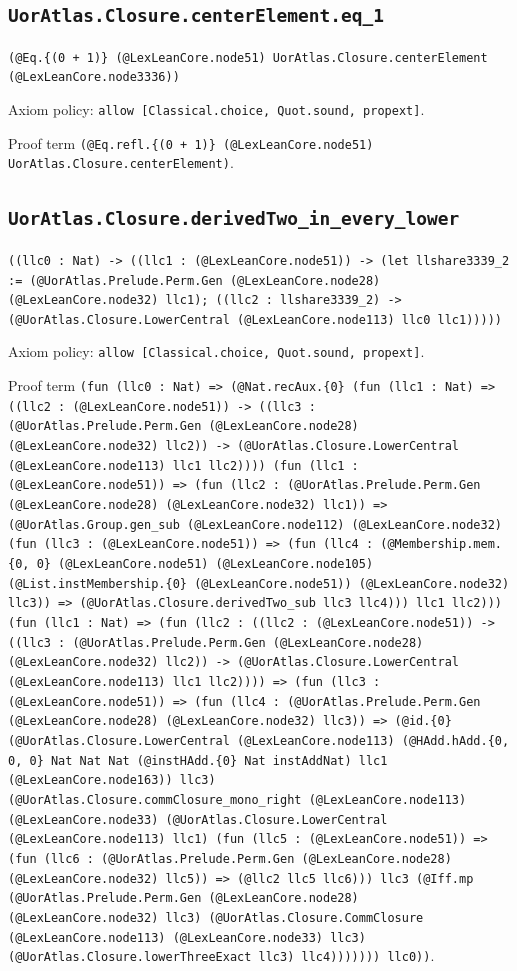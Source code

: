\documentclass[11pt]{article}
\begin{document}
\subsection*{\texttt{UorAtlas.Closure.centerElement.eq\_1}}
\noindent\texttt{(@Eq.\{(0 + 1)\} (@LexLeanCore.node51) UorAtlas.Closure.centerElement (@LexLeanCore.node3336))}\par
\noindent Axiom policy: \texttt{allow [Classical.choice, Quot.sound, propext]}.\par
\noindent Proof term \texttt{(@Eq.refl.\{(0 + 1)\} (@LexLeanCore.node51) UorAtlas.Closure.centerElement)}.\par
\subsection*{\texttt{UorAtlas.Closure.derivedTwo\_in\_every\_lower}}
\noindent\texttt{((llc0 : Nat) -> ((llc1 : (@LexLeanCore.node51)) -> (let llshare3339\_2 := (@UorAtlas.Prelude.Perm.Gen (@LexLeanCore.node28) (@LexLeanCore.node32) llc1); ((llc2 : llshare3339\_2) -> (@UorAtlas.Closure.LowerCentral (@LexLeanCore.node113) llc0 llc1)))))}\par
\noindent Axiom policy: \texttt{allow [Classical.choice, Quot.sound, propext]}.\par
\noindent Proof term \texttt{(fun (llc0 : Nat) => (@Nat.recAux.\{0\} (fun (llc1 : Nat) => ((llc2 : (@LexLeanCore.node51)) -> ((llc3 : (@UorAtlas.Prelude.Perm.Gen (@LexLeanCore.node28) (@LexLeanCore.node32) llc2)) -> (@UorAtlas.Closure.LowerCentral (@LexLeanCore.node113) llc1 llc2)))) (fun (llc1 : (@LexLeanCore.node51)) => (fun (llc2 : (@UorAtlas.Prelude.Perm.Gen (@LexLeanCore.node28) (@LexLeanCore.node32) llc1)) => (@UorAtlas.Group.gen\_sub (@LexLeanCore.node112) (@LexLeanCore.node32) (fun (llc3 : (@LexLeanCore.node51)) => (fun (llc4 : (@Membership.mem.\{0, 0\} (@LexLeanCore.node51) (@LexLeanCore.node105) (@List.instMembership.\{0\} (@LexLeanCore.node51)) (@LexLeanCore.node32) llc3)) => (@UorAtlas.Closure.derivedTwo\_sub llc3 llc4))) llc1 llc2))) (fun (llc1 : Nat) => (fun (llc2 : ((llc2 : (@LexLeanCore.node51)) -> ((llc3 : (@UorAtlas.Prelude.Perm.Gen (@LexLeanCore.node28) (@LexLeanCore.node32) llc2)) -> (@UorAtlas.Closure.LowerCentral (@LexLeanCore.node113) llc1 llc2)))) => (fun (llc3 : (@LexLeanCore.node51)) => (fun (llc4 : (@UorAtlas.Prelude.Perm.Gen (@LexLeanCore.node28) (@LexLeanCore.node32) llc3)) => (@id.\{0\} (@UorAtlas.Closure.LowerCentral (@LexLeanCore.node113) (@HAdd.hAdd.\{0, 0, 0\} Nat Nat Nat (@instHAdd.\{0\} Nat instAddNat) llc1 (@LexLeanCore.node163)) llc3) (@UorAtlas.Closure.commClosure\_mono\_right (@LexLeanCore.node113) (@LexLeanCore.node33) (@UorAtlas.Closure.LowerCentral (@LexLeanCore.node113) llc1) (fun (llc5 : (@LexLeanCore.node51)) => (fun (llc6 : (@UorAtlas.Prelude.Perm.Gen (@LexLeanCore.node28) (@LexLeanCore.node32) llc5)) => (@llc2 llc5 llc6))) llc3 (@Iff.mp (@UorAtlas.Prelude.Perm.Gen (@LexLeanCore.node28) (@LexLeanCore.node32) llc3) (@UorAtlas.Closure.CommClosure (@LexLeanCore.node113) (@LexLeanCore.node33) llc3) (@UorAtlas.Closure.lowerThreeExact llc3) llc4))))))) llc0))}.\par
\end{document}
